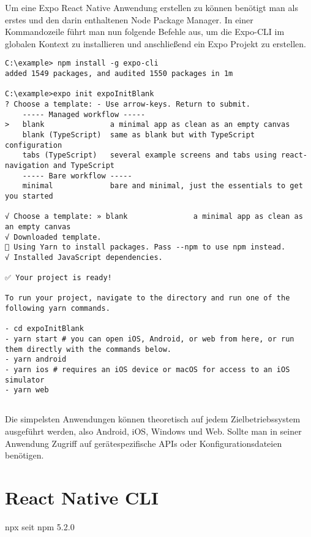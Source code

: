 Um eine Expo React Native Anwendung erstellen zu können benötigt man als erstes  und
den darin enthaltenen Node Package Manager. In einer Kommandozeile führt man nun folgende Befehle
aus, um die Expo-CLI im globalen Kontext zu installieren und anschließend ein Expo Projekt zu
erstellen.

\begin{lstlisting}
C:\example> npm install -g expo-cli
added 1549 packages, and audited 1550 packages in 1m

C:\example>expo init expoInitBlank
? Choose a template: - Use arrow-keys. Return to submit.
    ----- Managed workflow -----
>   blank               a minimal app as clean as an empty canvas
    blank (TypeScript)  same as blank but with TypeScript configuration
    tabs (TypeScript)   several example screens and tabs using react-navigation and TypeScript
    ----- Bare workflow -----
    minimal             bare and minimal, just the essentials to get you started

√ Choose a template: » blank               a minimal app as clean as an empty canvas
√ Downloaded template.
🧶 Using Yarn to install packages. Pass --npm to use npm instead.
√ Installed JavaScript dependencies.

✅ Your project is ready!

To run your project, navigate to the directory and run one of the following yarn commands.

- cd expoInitBlank
- yarn start # you can open iOS, Android, or web from here, or run them directly with the commands below.
- yarn android
- yarn ios # requires an iOS device or macOS for access to an iOS simulator
- yarn web
\end{lstlisting}


\subsection{}

Die simpelsten Anwendungen können theoretisch auf jedem Zielbetriebssystem ausgeführt werden, also
Android, iOS, Windows und Web. Sollte man in seiner Anwendung Zugriff auf gerätespezifische APIs
oder Konfigurationsdateien benötigen.

\section{React Native CLI}
npx seit npm 5.2.0